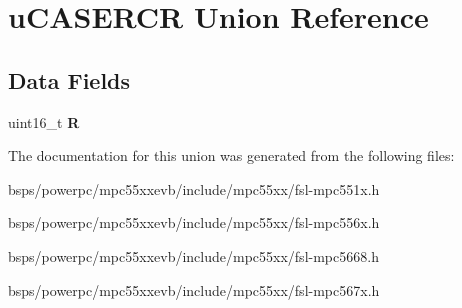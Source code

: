 \hypertarget{unionuCASERCR}{}\section{u\+C\+A\+S\+E\+R\+CR Union Reference}
\label{unionuCASERCR}
\subsection*{Data Fields}
\begin{DoxyCompactItemize}
\item 
\mbox{\label{unionuCASERCR_ad9602f0c2c7907577ad97ed2acc4fae1}} 
uint16\+\_\+t {\bfseries R}
\end{DoxyCompactItemize}


The documentation for this union was generated from the following files\+:\begin{DoxyCompactItemize}
\item 
bsps/powerpc/mpc55xxevb/include/mpc55xx/fsl-\/mpc551x.\+h\item 
bsps/powerpc/mpc55xxevb/include/mpc55xx/fsl-\/mpc556x.\+h\item 
bsps/powerpc/mpc55xxevb/include/mpc55xx/fsl-\/mpc5668.\+h\item 
bsps/powerpc/mpc55xxevb/include/mpc55xx/fsl-\/mpc567x.\+h\end{DoxyCompactItemize}
